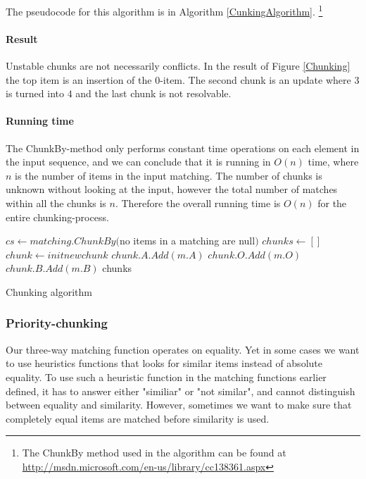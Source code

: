 \documentclass[11pt]{article}
\begin{document}
The pseudocode for this algorithm is in Algorithm \ref{CunkingAlgorithm}. \footnote{The ChunkBy method used in the algorithm can be found at \url{http://msdn.microsoft.com/en-us/library/cc138361.aspx}}

\paragraph{Result} Unstable chunks are not necessarily conflicts. In the result of Figure \ref{Chunking} the top item is an insertion of the $0$-item. The second chunk is an update where $3$ is turned into $4$ and the last chunk is not resolvable. 

\paragraph{Running time} The ChunkBy-method only performs constant time operations on each element in the input sequence, and we can conclude that it is running in $O(n)$ time, where $n$ is the number of items in the input matching. The number of chunks is unknown without looking at the input, however the total number of matches within all the chunks is $n$. Therefore the overall running time is $O(n)$ for the entire chunking-process.

\begin{algorithm}
\begin{algorithmic}
	\State $cs \gets matching.ChunkBy($no items in a matching are null$)$
	\State $chunks \gets []$
		\State $chunk \gets init new chunk$
				\State $chunk.A.Add(m.A)$
			\EndIf
				\State $chunk.O.Add(m.O)$
			\EndIf
				\State $chunk.B.Add(m.B)$
			\EndIf
		\EndFor
	\EndFor
	\State \Return chunks
\EndFunction
\end{algorithmic}
\caption{Chunking algorithm}
  \label{CunkingAlgorithm}
\end{algorithm}


\subsubsection{Priority-chunking}
\label{PriorityDiff}
Our three-way matching function operates on equality. Yet in some cases we want to use heuristics functions that looks for similar items instead of absolute equality. To use such a heuristic function in the matching functions earlier defined, it has to answer either "similiar" or "not similar", and cannot distinguish between equality and similarity. However, sometimes we want to make sure that completely equal items are matched before similarity is used.
\end{document}
